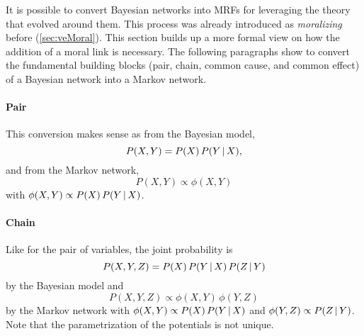 		It is possible to convert Bayesian networks into MRFs for leveraging the theory that evolved around them. This process was already introduced as \emph{moralizing} before (\autoref{sec:veMoral}).	 This section builds up a more formal view on how the addition of a moral link is necessary. The following paragraphs show to convert the fundamental building blocks (pair, chain, common cause, and common effect) of a Bayesian network into a Markov network.

		\paragraph{Pair}
			\begin{center}
			\end{center}
			This conversion makes sense as from the Bayesian model,
			\begin{equation}
				P(X, Y) = P(X) \, P(Y \,\vert\, X),
			\end{equation}
			and from the Markov network,
			\begin{equation}
				P(X, Y) \propto \phi(X, Y)
			\end{equation}
			with \( \phi(X, Y) \propto P(X) \, P(Y \,\vert\, X) \).

		\paragraph{Chain}
			\begin{center}
			\end{center}
			Like for the pair of variables, the joint probability is
			\begin{equation}
				P(X, Y, Z) = P(X) \, P(Y \,\vert\, X) \, P(Z \,\vert\, Y)
			\end{equation}
			by the Bayesian model and
			\begin{equation}
				P(X, Y, Z) \propto \phi(X, Y) \, \phi(Y, Z)
			\end{equation}
			by the Markov network with \( \phi(X, Y) \propto P(X) \, P(Y \,\vert\, X) \) and \( \phi(Y, Z) \propto P(Z \,\vert\, Y) \). Note that the parametrization of the potentials is not unique.

